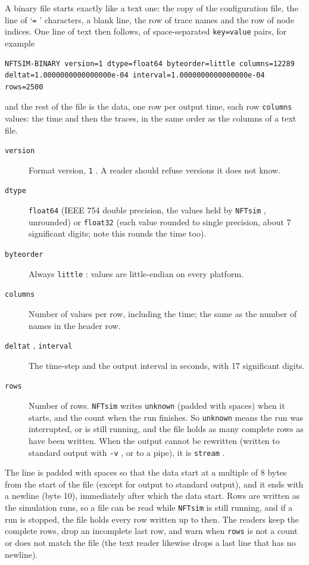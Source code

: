 \documentclass[12pt,a4paper]{article}
\newcommand{\type}[1]{{\small\small\tt #1} }
\newcommand{\NF}[0]{\type{NFTsim}}
\begin{document}
A binary file starts exactly like a text one: the copy of the configuration file, the line of `\type{=}' characters, a blank line, the row of trace names and the row of node indices.
One line of text then follows, of space-separated \type{key=value} pairs, for example
\begin{lstlisting}
NFTSIM-BINARY version=1 dtype=float64 byteorder=little columns=12289 deltat=1.0000000000000000e-04 interval=1.0000000000000000e-04 rows=2500
\end{lstlisting}
and the rest of the file is the data, one row per output time, each row \type{columns} values: the time and then the traces, in the same order as the columns of a text file.
\begin{description}
\item[\type{version}] Format version, \type{1}. A reader should refuse versions it does not know.
\item[\type{dtype}] \type{float64} (IEEE 754 double precision, the values held by \NF, unrounded) or \type{float32} (each value rounded to single precision, about 7 significant digits; note this rounds the time too).
\item[\type{byteorder}] Always \type{little}: values are little-endian on every platform.
\item[\type{columns}] Number of values per row, including the time; the same as the number of names in the header row.
\item[\type{deltat}, \type{interval}] The time-step and the output interval in seconds, with 17 significant digits.
\item[\type{rows}] Number of rows. \NF writes \type{unknown} (padded with spaces) when it starts, and the count when the run finishes. So \type{unknown} means the run was interrupted, or is still running, and the file holds as many complete rows as have been written. When the output cannot be rewritten (written to standard output with \type{-v}, or to a pipe), it is \type{stream}.
\end{description}
The line is padded with spaces so that the data start at a multiple of 8 bytes from the start of the file (except for output to standard output), and it ends with a newline (byte 10), immediately after which the data start.
Rows are written as the simulation runs, so a file can be read while \NF is still running, and if a run is stopped, the file holds every row written up to then.
The readers keep the complete rows, drop an incomplete last row, and warn when \type{rows} is not a count or does not match the file (the text reader likewise drops a last line that has no newline).
\end{document}
